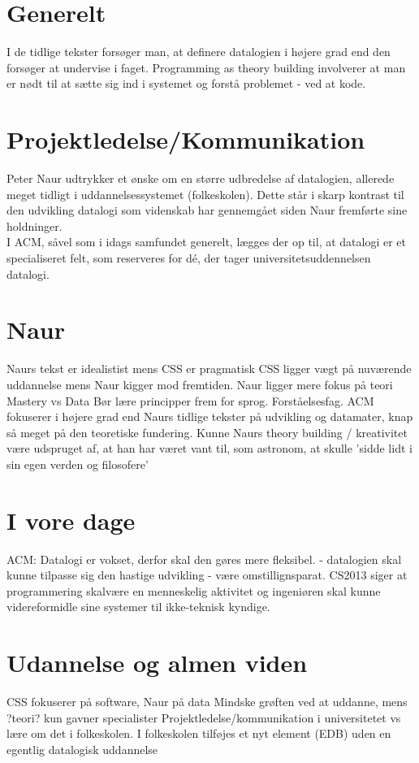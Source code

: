 \section{Generelt}
I de tidlige tekster forsøger man, at definere datalogien i højere grad end den forsøger at undervise i faget.
Programming as theory building involverer at man er nødt til at sætte sig ind i systemet og forstå problemet - ved at
kode.



\section{Projektledelse/Kommunikation}
Peter Naur udtrykker et ønske om en større udbredelse af datalogien, allerede
meget tidligt i uddannelsessystemet (folkeskolen). Dette står i skarp kontrast
til den udvikling datalogi som videnskab har gennemgået siden Naur fremførte sine
holdninger.\\
I ACM, såvel som i idags samfundet generelt, lægges der op til, at datalogi er et
specialiseret felt, som reserveres for dé, der tager universitetsuddennelsen
datalogi.

\section{Naur}
Naurs tekst er idealistist mens CSS er pragmatisk
CSS ligger vægt på nuværende uddannelse mens Naur kigger mod fremtiden.
Naur ligger mere fokus på teori
Mastery vs Data
Bør lære principper frem for sprog. Forståelsesfag.
ACM fokuserer i højere grad end Naurs tidlige tekster på udvikling og datamater, knap så
meget på den teoretiske fundering.
Kunne Naurs theory building / kreativitet være udspruget af, at han har været vant til, som astronom, at skulle
'sidde lidt i sin egen verden og filosofere'


\section{I vore dage}
ACM: Datalogi er vokset, derfor skal den gøres mere fleksibel.
        - datalogien skal kunne tilpasse sig den hastige udvikling - være omstillignsparat.
CS2013 siger at programmering skalvære en menneskelig aktivitet og ingeniøren skal kunne videreformidle sine systemer til ikke-teknisk kyndige.

\section{Udannelse og almen viden}
CSS fokuserer på software, Naur på data
Mindske grøften ved at uddanne, mens ?teori? kun gavner specialister
Projektledelse/kommunikation i universitetet vs lære om det i folkeskolen.
I folkeskolen tilføjes et nyt element (EDB) uden en egentlig datalogisk uddannelse

